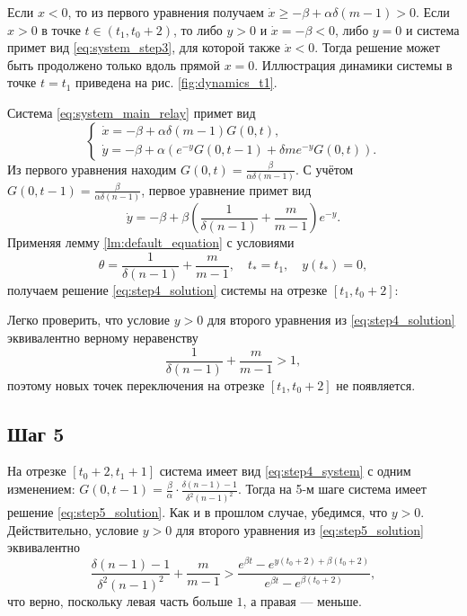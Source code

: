 Если $x < 0$, то из первого уравнения получаем $\dot{x} \geqslant -\beta + \alpha \delta (m - 1) > 0$. Если $x > 0$ в точке $t \in (t_1, t_0 + 2)$, то либо $y > 0$ и $\dot{x} = -\beta < 0$, либо $y = 0$ и система примет вид \eqref{eq:system_step3}, для которой также $\dot{x} < 0$. Тогда решение может быть продолжено только вдоль прямой $x = 0$. Иллюстрация динамики системы в точке $t=t_1$ приведена на рис. \ref{fig:dynamics_t1}.

Система \eqref{eq:system_main_relay} примет вид
%
\begin{equation}
	\label{eq:step4_system}
	\begin{cases}
		\dot{x} = -\beta + \alpha \delta (m - 1) G(0, t),\\
		\dot{y} = -\beta + \alpha \left(e^{-y} G(0, t - 1) + \delta m e^{-y} G(0, t)\right).
	\end{cases}
\end{equation}
%
Из первого уравнения находим $G(0, t) = \frac{\beta}{\alpha \delta (m - 1)}$. С учётом $G(0, t - 1) = \frac{\beta}{\alpha \delta (n - 1)}$, первое уравнение примет вид
\[
\dot{y} = -\beta + \beta \left(\dfrac{1}{\delta(n - 1)} + \dfrac{m}{m - 1} \right) e^{-y}.
\]
%
Применяя лемму \ref{lm:default_equation} с условиями
\[
\theta = \dfrac{1}{\delta(n - 1)} + \dfrac{m}{m - 1}, \quad t_* = t_1, \quad y(t_*) = 0,
\]
получаем решение \eqref{eq:step4_solution} системы на отрезке $[t_1, t_0 + 2]$:

Легко проверить, что условие $y > 0$ для второго уравнения из \eqref{eq:step4_solution} эквивалентно верному неравенству
\[
\dfrac{1}{\delta(n - 1)} + \dfrac{m}{m - 1} > 1,
\]
поэтому новых точек переключения на отрезке $[t_1, t_0 + 2]$ не появляется.

\subsection{Шаг 5}
На отрезке $[t_0 + 2, t_1 + 1]$ система имеет вид \eqref{eq:step4_system} с одним изменением: $G(0, t - 1) = \frac{\beta}{\alpha} \cdot \frac{\delta(n - 1) - 1}{\delta^2 (n - 1)^2}$.
%
Тогда на 5-м шаге система имеет решение \eqref{eq:step5_solution}.
%
Как и в прошлом случае, убедимся, что $y > 0$. Действительно, условие $y > 0$ для второго уравнения из \eqref{eq:step5_solution} эквивалентно
\[
\frac{\delta(n - 1) - 1}{\delta^2 (n - 1)^2} + \dfrac{m}{m - 1} > \dfrac{e^{\beta t} - e^{y(t_0 + 2) + \beta (t_0 + 2)}}{e^{\beta t} - e^{\beta (t_0 + 2)}},
\]
что верно, поскольку левая часть больше $1$, а правая --- меньше.

